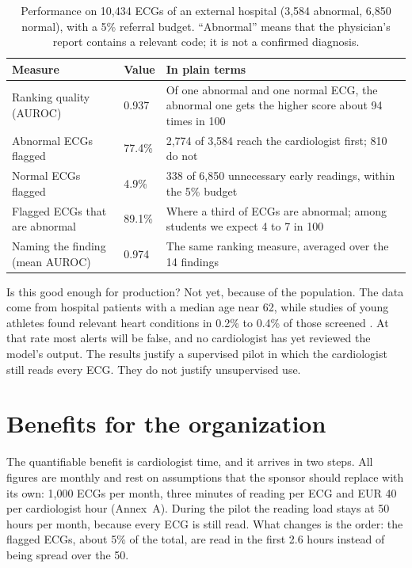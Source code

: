 \documentclass[letterpaper,11pt]{article}
\begin{document}
\begin{table}[H]
  \centering
  \caption{Performance on 10,434 ECGs of an external hospital (3,584 abnormal, 6,850 normal), with a 5\% referral budget. ``Abnormal'' means that the physician's report contains a relevant code; it is not a confirmed diagnosis.}
  \label{tab:metrics}
  \small
  \begin{tabular}{p{4.6cm}p{2.1cm}p{8.3cm}}
    \toprule
    Measure & Value & In plain terms \\
    \midrule
    Ranking quality (AUROC) & 0.937 & Of one abnormal and one normal ECG, the abnormal one gets the higher score about 94 times in 100 \\
    Abnormal ECGs flagged & 77.4\% & 2,774 of 3,584 reach the cardiologist first; 810 do not \\
    Normal ECGs flagged & 4.9\% & 338 of 6,850 unnecessary early readings, within the 5\% budget \\
    Flagged ECGs that are abnormal & 89.1\% & Where a third of ECGs are abnormal; among students we expect 4 to 7 in 100 \\
    Naming the finding (mean AUROC) & 0.974 & The same ranking measure, averaged over the 14 findings \\
    \bottomrule
  \end{tabular}
\end{table}

Is this good enough for production? Not yet, because of the population. The data come from hospital patients with a median age near 62, while studies of young athletes found relevant heart conditions in 0.2\% to 0.4\% of those screened \parencite{drezner2016electrocardiographic,williams2019performance}. At that rate most alerts will be false, and no cardiologist has yet reviewed the model's output. The results justify a supervised pilot in which the cardiologist still reads every ECG. They do not justify unsupervised use.

\section*{Benefits for the organization}

The quantifiable benefit is cardiologist time, and it arrives in two steps. All figures are monthly and rest on assumptions that the sponsor should replace with its own: 1,000 ECGs per month, three minutes of reading per ECG and EUR 40 per cardiologist hour (Annex~A). During the pilot the reading load stays at 50 hours per month, because every ECG is still read. What changes is the order: the flagged ECGs, about 5\% of the total, are read in the first 2.6 hours instead of being spread over the 50.
\end{document}

